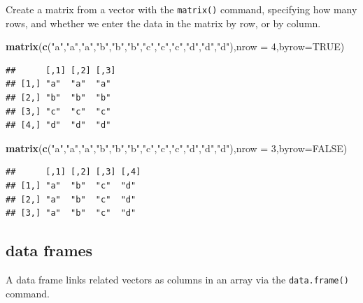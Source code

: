 \documentclass[
]{book}
\newenvironment{Shaded}{\begin{snugshade}}{\end{snugshade}}
\newcommand{\AttributeTok}[1]{\textcolor[rgb]{0.13,0.29,0.53}{#1}}
\newcommand{\ConstantTok}[1]{\textcolor[rgb]{0.56,0.35,0.01}{#1}}
\newcommand{\DecValTok}[1]{\textcolor[rgb]{0.00,0.00,0.81}{#1}}
\newcommand{\FunctionTok}[1]{\textcolor[rgb]{0.13,0.29,0.53}{\textbf{#1}}}
\newcommand{\NormalTok}[1]{#1}
\newcommand{\StringTok}[1]{\textcolor[rgb]{0.31,0.60,0.02}{#1}}
\theoremstyle{definition}
\theoremstyle{definition}
\theoremstyle{definition}
\theoremstyle{definition}
\theoremstyle{remark}
\begin{document}
Create a matrix from a vector with the \texttt{matrix()} command, specifying how many rows, and whether we enter the data in the matrix by row, or by column.

\begin{Shaded}
\begin{Highlighting}[]
\FunctionTok{matrix}\NormalTok{(}\FunctionTok{c}\NormalTok{(}\StringTok{"a"}\NormalTok{,}\StringTok{"a"}\NormalTok{,}\StringTok{"a"}\NormalTok{,}\StringTok{"b"}\NormalTok{,}\StringTok{"b"}\NormalTok{,}\StringTok{"b"}\NormalTok{,}\StringTok{"c"}\NormalTok{,}\StringTok{"c"}\NormalTok{,}\StringTok{"c"}\NormalTok{,}\StringTok{"d"}\NormalTok{,}\StringTok{"d"}\NormalTok{,}\StringTok{"d"}\NormalTok{),}\AttributeTok{nrow =} \DecValTok{4}\NormalTok{,}\AttributeTok{byrow=}\ConstantTok{TRUE}\NormalTok{)}
\end{Highlighting}
\end{Shaded}

\begin{verbatim}
##      [,1] [,2] [,3]
## [1,] "a"  "a"  "a" 
## [2,] "b"  "b"  "b" 
## [3,] "c"  "c"  "c" 
## [4,] "d"  "d"  "d"
\end{verbatim}

\begin{Shaded}
\begin{Highlighting}[]
\FunctionTok{matrix}\NormalTok{(}\FunctionTok{c}\NormalTok{(}\StringTok{"a"}\NormalTok{,}\StringTok{"a"}\NormalTok{,}\StringTok{"a"}\NormalTok{,}\StringTok{"b"}\NormalTok{,}\StringTok{"b"}\NormalTok{,}\StringTok{"b"}\NormalTok{,}\StringTok{"c"}\NormalTok{,}\StringTok{"c"}\NormalTok{,}\StringTok{"c"}\NormalTok{,}\StringTok{"d"}\NormalTok{,}\StringTok{"d"}\NormalTok{,}\StringTok{"d"}\NormalTok{),}\AttributeTok{nrow =} \DecValTok{3}\NormalTok{,}\AttributeTok{byrow=}\ConstantTok{FALSE}\NormalTok{)}
\end{Highlighting}
\end{Shaded}

\begin{verbatim}
##      [,1] [,2] [,3] [,4]
## [1,] "a"  "b"  "c"  "d" 
## [2,] "a"  "b"  "c"  "d" 
## [3,] "a"  "b"  "c"  "d"
\end{verbatim}

\subsection{data frames}\label{data-frames}

A data frame links related vectors as columns in an array via the \texttt{data.frame()} command.
\end{document}
